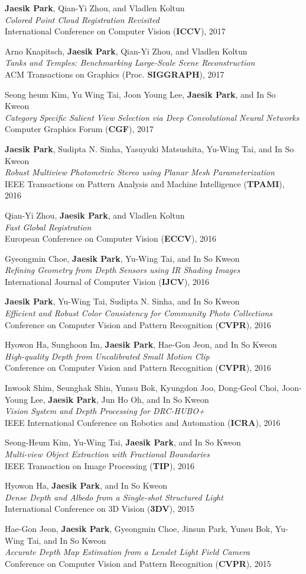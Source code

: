 \documentclass[letterpaper,11pt]{article}
\newcommand{\publicationItem}[3]{
  \small{
  \item{#1\\ \emph{#2}\\ #3\vspace{-2pt}}
  }
}
\begin{document}
    \publicationItem{\textbf{Jaesik Park}, Qian-Yi Zhou, and Vladlen Koltun}{Colored Point Cloud Registration Revisited}{International Conference on Computer Vision (\textbf{ICCV}), 2017}
    \publicationItem{Arno Knapitsch, \textbf{Jaesik Park}, Qian-Yi Zhou, and Vladlen Koltun}{Tanks and Temples: Benchmarking Large-Scale Scene Reconstruction}{ACM Transactions on Graphics (Proc. \textbf{SIGGRAPH}), 2017}
    \publicationItem{Seong heum Kim, Yu Wing Tai, Joon Young Lee, \textbf{Jaesik Park}, and In So Kweon}{Category Specific Salient View Selection via Deep Convolutional Neural Networks}{Computer Graphics Forum (\textbf{CGF}), 2017}
    \publicationItem{\textbf{Jaesik Park}, Sudipta N. Sinha, Yasuyuki Matsushita, Yu-Wing Tai, and In So Kweon}{Robust Multiview Photometric Stereo using Planar Mesh Parameterization}{IEEE Transactions on Pattern Analysis and Machine Intelligence (\textbf{TPAMI}), 2016}
    \publicationItem{Qian-Yi Zhou, \textbf{Jaesik Park}, and Vladlen Koltun}{Fast Global Registration}{European Conference on Computer Vision (\textbf{ECCV}), 2016}
    \publicationItem{Gyeongmin Choe, \textbf{Jaesik Park}, Yu-Wing Tai, and In So Kweon}{Refining Geometry from Depth Sensors using IR Shading Images}{International Journal of Computer Vision (\textbf{IJCV}), 2016}
    \publicationItem{\textbf{Jaesik Park}, Yu-Wing Tai, Sudipta N. Sinha, and In So Kweon}{Efficient and Robust Color Consistency for Community Photo Collections}{Conference on Computer Vision and Pattern Recognition (\textbf{CVPR}), 2016}
    \publicationItem{Hyowon Ha, Sunghoon Im, \textbf{Jaesik Park}, Hae-Gon Jeon, and In So Kweon}{High-quality Depth from Uncalibrated Small Motion Clip}{Conference on Computer Vision and Pattern Recognition (\textbf{CVPR}), 2016}
    \publicationItem{Inwook Shim, Seunghak Shin, Yunsu Bok, Kyungdon Joo, Dong-Geol Choi, Joon-Young Lee, \textbf{Jaesik Park}, Jun Ho Oh, and In So Kweon}{Vision System and Depth Processing for DRC-HUBO+}{IEEE International Conference on Robotics and Automation (\textbf{ICRA}), 2016}
    \publicationItem{Seong-Heum Kim, Yu-Wing Tai, \textbf{Jaesik Park}, and In So Kweon}{Multi-view Object Extraction with Fractional Boundaries}{IEEE Transaction on Image Processing (\textbf{TIP}), 2016}
    \publicationItem{Hyowon Ha, \textbf{Jaesik Park}, and In So Kweon}{Dense Depth and Albedo from a Single-shot Structured Light}{International Conference on 3D Vision (\textbf{3DV}), 2015}
    \publicationItem{Hae-Gon Jeon, \textbf{Jaesik Park}, Gyeongmin Choe, Jinsun Park, Yunsu Bok, Yu-Wing Tai, and In So Kweon}{Accurate Depth Map Estimation from a Lenslet Light Field Camera}{Conference on Computer Vision and Pattern Recognition (\textbf{CVPR}), 2015}
\end{document}
